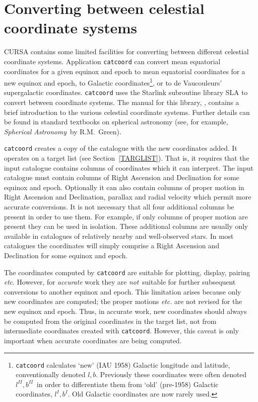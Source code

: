 \documentclass[twoside,11pt]{starlink}
\begin{document}
\section{\label{CONCOORD}Converting between celestial
coordinate systems}

CURSA contains some limited facilities for converting between different
celestial coordinate systems.  Application \texttt{catcoord} can convert
mean equatorial coordinates for a given equinox and epoch to mean
equatorial coordinates for a new equinox and epoch, to Galactic
coordinates\footnote{\texttt{catcoord} calculates `new' (IAU 1958)
Galactic longitude and latitude, conventionally denoted $l,b$.
Previously these coordinates were often denoted $l^{II},b^{II}$\,
in order to differentiate them from `old' (pre-1958) Galactic
coordinates, $l^{I},b^{I}$.  Old Galactic coordinates are now rarely
used.}, or to de Vaucouleurs' supergalactic coordinates.  \texttt{catcoord}
uses the Starlink subroutine library SLA to convert between coordinate
systems.  The manual for this library, \cite{SUN67},
contains a brief introduction to the various celestial coordinate systems.
Further details can be found in standard textbooks on spherical astronomy
(see, for example, \textit{Spherical Astronomy}\, by R.M.~Green\cite{GREEN}).

\texttt{catcoord} creates a copy of the catalogue with the new coordinates
added.  It operates on a target list (see Section~\ref{TARGLIST}).
That is, it requires that the input catalogue contains columns of
coordinates which it can interpret.  The input catalogue must contain
columns of Right Ascension and Declination for some equinox and epoch.
Optionally it can also contain columns of proper motion in Right
Ascension and Declination, parallax and radial velocity which permit
more accurate conversions.  It is not necessary that all four additional
columns be present in order to use them.  For example, if only columns
of proper motion are present they can be used in isolation.  These additional
columns are usually only available in catalogues of relatively nearby and
well-observed stars.  In most catalogues the coordinates will simply
comprise a Right Ascension and Declination for some equinox and epoch.

The coordinates computed by \texttt{catcoord} are suitable for plotting,
display, pairing \emph{etc}.  However, for \textit{accurate} work they are \textit{not}\, suitable for further subsequent conversions to another equinox
and epoch.  This limitation arises because only new coordinates are
computed; the proper motions \emph{etc.} are not revised for the new equinox
and epoch.  Thus, in accurate work, new coordinates should always be
computed from the original coordinates in the target list, not from
intermediate coordinates created with \texttt{catcoord}.  However, this
caveat is only important when accurate coordinates are being computed.
\end{document}
